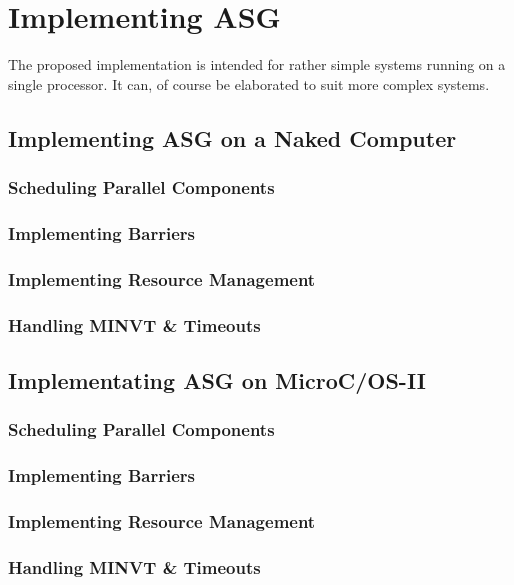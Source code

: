 \documentclass[../main.tex]{subfiles}
\begin{document}
\chapter{Implementing ASG}
The proposed implementation is intended for rather simple systems running on a single processor. It can, of course be elaborated to suit more complex systems.

\section{Implementing ASG on a Naked Computer}

\subsection{Scheduling Parallel Components}
\subsection{Implementing Barriers}
\subsection{Implementing Resource Management}
\subsection{Handling MINVT \& Timeouts}

\section{Implementating ASG on MicroC/OS-II}

\subsection{Scheduling Parallel Components}
\subsection{Implementing Barriers}
\subsection{Implementing Resource Management}
\subsection{Handling MINVT \& Timeouts}
\end{document}

